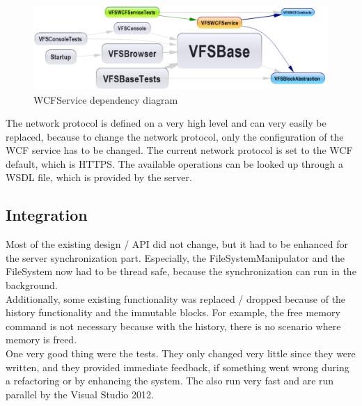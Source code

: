 \documentclass[JCDReport.tex]{subfiles}
\begin{document}
\begin{figure}[h!]
	\centering
	\includegraphics[scale=0.5]{Images/wcf_service_dependencies.png} 
	\caption{WCFService dependency diagram}
	\label{fig:wcfDependencDiagram}
\end{figure}	

The network protocol is defined on a very high level and can very easily be replaced, because to change the network protocol, only the configuration of the WCF service has to be changed. The current network protocol is set to the WCF default, which is HTTPS. The available operations can be looked up through a WSDL file, which is provided by the server.\\

\subsection{Integration}


Most of the existing design / API did not change, but it had to be enhanced for the server synchronization part. Especially, the FileSystemManipulator and the FileSystem now had to be thread safe, because the synchronization can run in the background.\\

Additionally, some existing functionality was replaced / dropped because of the history functionality and the immutable blocks. For example, the free memory command is not necessary because with the history, there is no scenario where memory is freed.\\

One very good thing were the tests. They only changed very little since they were written, and they provided immediate feedback, if something went wrong during a refactoring or by enhancing the system. The also run very fast and are run parallel by the Visual Studio 2012.
\end{document}
